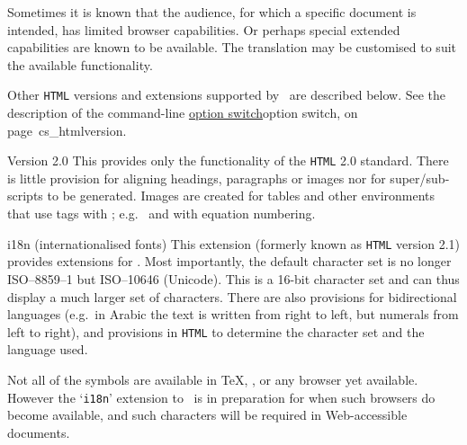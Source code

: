 \medskip\noindent
Sometimes it is known that the audience, for which a specific document 
is intended, has limited browser capabilities. 
Or perhaps special extended capabilities are known to be available.
The \latextohtml{} translation may be customised to suit the
available functionality.

\medskip\noindent
Other \texttt{HTML} versions and extensions 
supported by \latextohtml\ are described below.
See the description of the  command-line
\hyperref[page]{option switch}{option switch, on page~}{}{cs_htmlversion}.
%
\begin{htmllist}
\addtolength{\leftskip}{15pt}
%
\item[Version 2.0\label{html20}]
This provides only the functionality of the \texttt{HTML} 2.0 standard.
There is little provision for aligning headings, paragraphs or images
nor for super/sub-scripts to be generated. Images are created for tables 
and other environments that use  tags with \HTMLiii;
e.g.\  and  with equation numbering.

%
%
%
%
%
%
%
\item[i18n (internationalised fonts) \strikeout{Version 2.1}]
This extension (formerly known as \texttt{HTML} version 2.1)
provides extensions for .
Most importantly, the default character set is no longer ISO--8859--1 
but {ISO--10646} (Unicode).
This is a 16-bit character set and can thus display a much larger set of characters.
There are also provisions for bidirectional languages 
(e.g.\ in Arabic the text is written from right to left, 
but numerals from left to right), and provisions in \texttt{HTML} 
to determine the character set and the language used.

Not all of the symbols are available in \TeX, \latextohtml, 
or any browser yet available.  
However the `\texttt{i18n}' extension to \latextohtml\ is in preparation
for when such browsers do become available, and such characters
will be required in Web-accessible documents. 



\end{htmllist}
